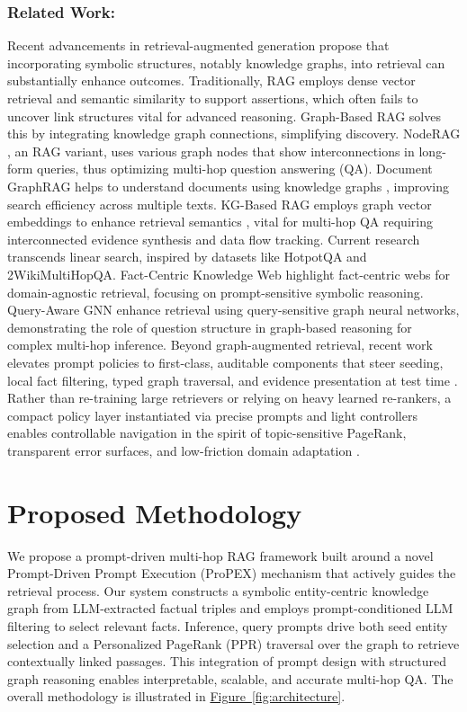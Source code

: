 \documentclass[runningheads]{llncs}
\begin{document}
\subsubsection{Related Work:}
\noindent
\justifying
\sloppy
Recent advancements in retrieval-augmented generation propose that incorporating symbolic structures, notably knowledge graphs, into retrieval can substantially enhance outcomes. Traditionally, RAG employs dense vector retrieval and semantic similarity to support assertions, which often fails to uncover link structures vital for advanced reasoning. Graph-Based RAG solves this by integrating knowledge graph connections, simplifying discovery. NodeRAG \cite{xu2025noderag}, an RAG variant, uses various graph nodes that show interconnections in long-form queries, thus optimizing multi-hop question answering (QA). Document GraphRAG helps to understand documents using knowledge graphs \cite{knollmeyer2025document}, improving search efficiency across multiple texts. KG-Based RAG employs graph vector embeddings to enhance retrieval semantics \cite{shavaki2024knowledge}, vital for multi-hop QA requiring interconnected evidence synthesis and data flow tracking. Current research transcends linear search, inspired by datasets like HotpotQA and 2WikiMultiHopQA. Fact-Centric Knowledge Web \cite{sinha2024factcentric} highlight fact-centric webs for domain-agnostic retrieval, focusing on prompt-sensitive symbolic reasoning. Query-Aware GNN \cite{agrawal2025queryaware} enhance retrieval using query-sensitive graph neural networks, demonstrating the role of question structure in graph-based reasoning for complex multi-hop inference.
Beyond graph-augmented retrieval, recent work elevates prompt policies to first-class, auditable components that steer seeding, local fact filtering, typed graph traversal, and evidence presentation at test time \cite{wei2022chain}. Rather than re-training large retrievers or relying on heavy learned re-rankers, a compact policy layer instantiated via precise prompts and light controllers enables controllable navigation in the spirit of topic-sensitive PageRank, transparent error surfaces, and low-friction domain adaptation \cite{haveliwala2002topic,peng2024graphrag_survey}.

\section{Proposed Methodology}
We propose a prompt-driven multi-hop RAG framework built around a novel Prompt-Driven Prompt Execution (ProPEX) mechanism that actively guides the retrieval process. Our system constructs a symbolic entity-centric knowledge graph from LLM-extracted factual triples and employs prompt-conditioned LLM filtering to select relevant facts. Inference, query prompts drive both seed entity selection and a Personalized PageRank (PPR) traversal over the graph to retrieve contextually linked passages. This integration of prompt design with structured graph reasoning enables interpretable, scalable, and accurate multi-hop QA.  The overall methodology is illustrated in {\hypersetup{linkcolor=softblue}\hyperref[fig:architecture]{Figure~\ref*{fig:architecture}}}.
\end{document}
